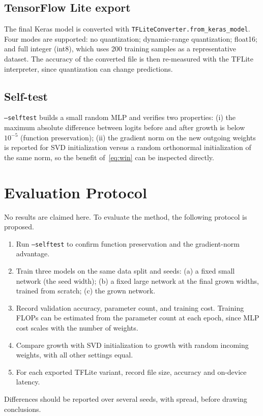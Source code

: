 \documentclass[11pt,a4paper]{article}
\newcommand{\code}[1]{\texttt{#1}}
\begin{document}
\subsection{TensorFlow Lite export}
The final Keras model is converted with \code{TFLiteConverter.from\_keras\_model}. Four modes are supported: no quantization; dynamic-range quantization; float16; and full integer (int8), which uses 200 training samples as a representative dataset. The accuracy of the converted file is then re-measured with the TFLite interpreter, since quantization can change predictions.

\subsection{Self-test}
\code{--selftest} builds a small random MLP and verifies two properties: (i) the maximum absolute difference between logits before and after growth is below $10^{-5}$ (function preservation); (ii) the gradient norm on the new outgoing weights is reported for SVD initialization versus a random orthonormal initialization of the same norm, so the benefit of~\eqref{eq:win} can be inspected directly.

\section{Evaluation Protocol}\label{sec:eval}
No results are claimed here. To evaluate the method, the following protocol is proposed.
\begin{enumerate}[nosep]
  \item Run \code{--selftest} to confirm function preservation and the gradient-norm advantage.
  \item Train three models on the same data split and seeds: (a) a fixed small network (the seed width); (b) a fixed large network at the final grown widths, trained from scratch; (c) the grown network.
  \item Record validation accuracy, parameter count, and training cost. Training FLOPs can be estimated from the parameter count at each epoch, since MLP cost scales with the number of weights.
  \item Compare growth with SVD initialization to growth with random incoming weights, with all other settings equal.
  \item For each exported TFLite variant, record file size, accuracy and on-device latency.
\end{enumerate}
Differences should be reported over several seeds, with spread, before drawing conclusions.
\end{document}
